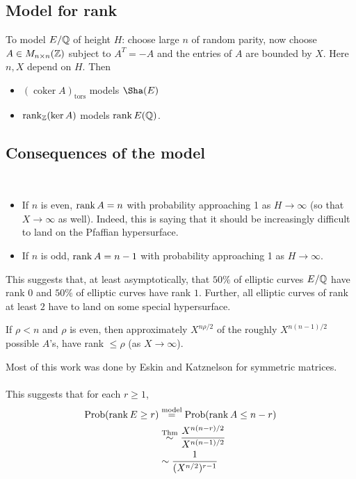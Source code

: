 \documentclass[12pt,amsfont]{amsart}
\begin{document}
\subsection{Model for rank}

To model $E/{\mathbb Q}$ of height $H$: choose large $n$ of random parity, now choose $A \in M_{n \times n}({\mathbb Z})$ subject to $A^T = -A$ and the entries of $A$ are bounded by $X$. Here $n, X$ depend on $H$. Then
{\ }
\begin{itemize}
\item
$(\operatorname{coker} A)_{\text{tors}}$ models $\Sha(E)$
\item
$\operatorname{rank}_{\mathbb Z}(\ker A)$ models $\operatorname{rank} E({\mathbb Q})$. 

\end{itemize}

\subsection{Consequences of the model}

{\ }
\begin{itemize}
\item
If $n$ is even, $\operatorname{rank} A = n$ with probability approaching 1 as $H \rightarrow \infty$ (so that $X \rightarrow \infty$ as well). Indeed, this is saying that it should be increasingly difficult to land on the Pfaffian hypersurface.  
\item
If $n$ is odd, $\operatorname{rank} A = n-1$ with probability approaching 1 as $H \rightarrow \infty$.
\end{itemize}

This suggests that, at least asymptotically, that $50\%$ of elliptic curves $E/{\mathbb Q}$ have rank 0 and $50\%$ of elliptic curves have rank $1$. Further, all elliptic curves of rank at least $2$ have to land on some special hypersurface. 

\begin{thm} If $\rho < n$ and $\rho$ is even, then approximately $X^{n \rho/2}$ of the roughly $X^{n(n-1)/2}$ possible $A$'s, have rank $\leq \rho$ (as $X \rightarrow \infty$). 
\end{thm}

Most of this work was done by Eskin and Katznelson  for symmetric matrices. \\ \\
This suggests that for each $r \geq 1$, 
\begin{align*}\operatorname{Prob}(\operatorname{rank} E \geq r) & \overset{\text{model}}{=} \operatorname{Prob}(\operatorname{rank} A \leq n-r) \\ 
& \overset{\text{Thm}}{\sim} \frac{X^{n(n-r)/2}}{X^{n(n-1)/2}} \\
& \sim \frac{1}{(X^{n/2})^{r-1}}
\end{align*}
\end{document}
